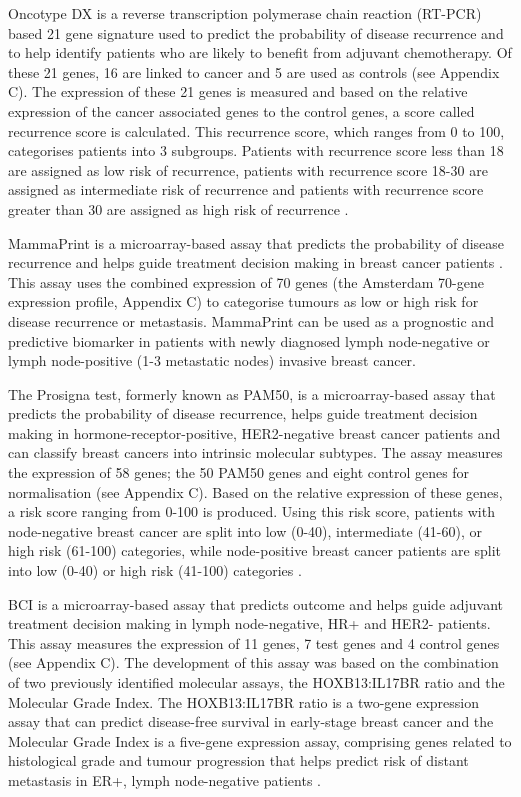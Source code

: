 Oncotype DX is a reverse transcription polymerase chain reaction (RT-PCR) based 21 gene signature used to predict the probability of disease recurrence and to help identify patients who are likely to benefit from adjuvant chemotherapy. Of these 21 genes, 16 are linked to cancer and 5 are used as controls (see Appendix C). The expression of these 21 genes is measured and based on the relative expression of the cancer associated genes to the control genes, a score called recurrence score is calculated. This recurrence score, which ranges from 0 to 100, categorises patients into 3 subgroups. Patients with recurrence score less than 18 are assigned as low risk of recurrence, patients with recurrence score 18-30 are assigned as intermediate risk of recurrence and patients with recurrence score greater than 30 are assigned as high risk of recurrence \citep{pmid15591335, pmid28882552}. 

MammaPrint is a microarray-based assay that predicts the probability of disease recurrence and helps guide treatment decision making in breast cancer patients \citep{pmid11823860, pmid12490681, pmid20204499, pmid28882552}. This assay uses the combined expression of 70 genes (the Amsterdam 70-gene expression profile, Appendix C) to categorise tumours as low or high risk for disease recurrence or metastasis. MammaPrint can be used as a prognostic and predictive biomarker in patients with newly diagnosed lymph node-negative or lymph node-positive (1-3 metastatic nodes) invasive breast cancer. 

The Prosigna test, formerly known as PAM50, is a microarray-based assay that predicts the probability of disease recurrence, helps guide treatment decision making in hormone-receptor-positive, HER2-negative breast cancer patients and can classify breast cancers into intrinsic molecular subtypes. The assay measures the expression of 58 genes; the 50 PAM50 genes and eight control genes for normalisation (see Appendix C). Based on the relative expression of these genes, a risk score ranging from 0-100 is produced. Using this risk score, patients with node-negative breast cancer are split into low (0-40), intermediate (41-60), or high risk (61-100) categories, while node-positive breast cancer patients are split into low (0-40) or high risk (41-100) categories \citep{DUFFY2017284, pmid28882552}.   

BCI is a microarray-based assay that predicts outcome and helps guide adjuvant treatment decision making in lymph node-negative, HR+ and HER2- patients. This assay measures the expression of 11 genes, 7 test genes and 4 control genes (see Appendix C). The development of this assay was based on the combination of two previously identified molecular assays, the HOXB13:IL17BR ratio and the Molecular Grade Index. The HOXB13:IL17BR ratio is a two-gene expression assay that can predict disease-free survival in early-stage breast cancer \citep{pmid15193263} and the Molecular Grade Index is a five-gene expression assay, comprising genes related to histological grade and tumour progression that helps predict risk of distant metastasis in ER+, lymph node-negative patients \citep{pmid18451222}.  

